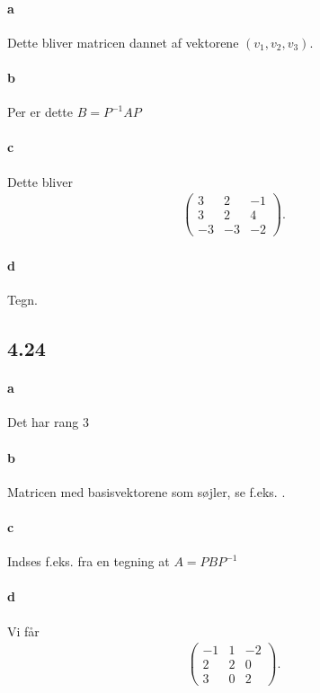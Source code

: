 			\paragraph{a} Dette bliver matricen dannet af vektorene $(v_1,v_2,v_3)$.

			\paragraph{b} Per \cite[Sætning 4.4.14]{hesselholt2017} er dette $B=P^{-1}AP$

			\paragraph{c} Dette bliver
				\begin{align*}
					\left(\begin{array}{rrr} {3} & {2} & {-1} \\ {3} & {2} & {4} \\ -3 & -3 & -2 \end{array}\right).
				\end{align*} 

			\paragraph{d} Tegn.

		\subsection{4.24}

			\paragraph{a} Det har rang $3$

			\paragraph{b} Matricen med basisvektorene som søjler, se f.eks. \cite[Eks. 4.4.6]{hesselholt2017}.

			\paragraph{c} Indses f.eks. fra en tegning at $A=PBP^{-1}$

			\paragraph{d} Vi får
				\begin{align*}
					\left(\begin{array}{rrr} {-1} & {1} & {-2} \\ {2} & {2} & {0} \\ 3 & 0 & 2 \end{array}\right).
				\end{align*}

